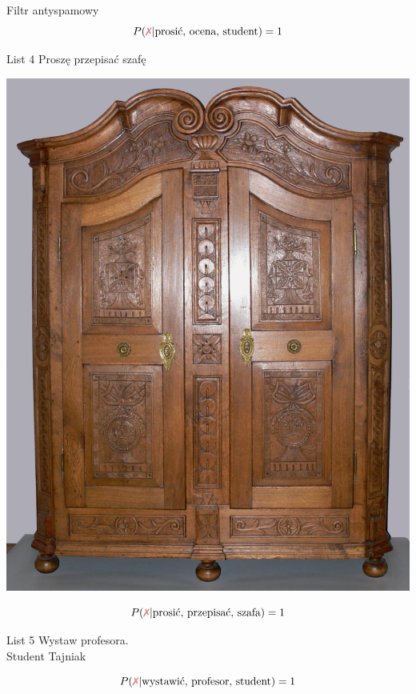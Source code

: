 \documentclass{mp}
\begin{document}
\begin{frame}{Filtr antyspamowy}
{\[ P(\xmark | \text{prosić, ocena, student})=1 \]
}
{
	\begin{minipage}{.50\textwidth}
\begin{block}{List 4}
Proszę przepisać szafę
\end{block}
\end{minipage}
\hfill
\begin{minipage}{.45\textwidth}
\begin{centering}
\includegraphics[height=.4\textheight]{Eichenschrank_Oberschwaben.jpg}\\
\end{centering}
\end{minipage}
\[ P(\xmark | \text{prosić, przepisać, szafa})=1 \]
}
{
	\begin{minipage}{.50\textwidth}
\begin{block}{List 5}
Wystaw profesora.\\
Student Tajniak
\end{block}
\end{minipage}
\hfill
\begin{minipage}{.45\textwidth}
\begin{centering}
\def\svgwidth{.8\textwidth}

\end{centering}
\end{minipage}
\[ P(\xmark | \text{wystawić, profesor, student})=1 \]
}


\end{frame}
\end{document}
